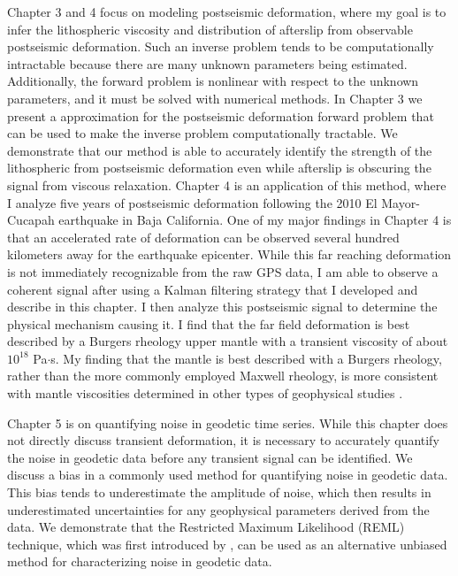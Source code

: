 Chapter 3 and 4 focus on modeling postseismic deformation, where my
goal is to infer the lithospheric viscosity and distribution of
afterslip from observable postseismic deformation. Such an inverse
problem tends to be computationally intractable because there are many
unknown parameters being estimated. Additionally, the forward problem
is nonlinear with respect to the unknown parameters, and it must be
solved with numerical methods. In Chapter 3 we present a approximation
for the postseismic deformation forward problem that can be used to
make the inverse problem computationally tractable. We demonstrate
that our method is able to accurately identify the strength of the
lithospheric from postseismic deformation even while afterslip is
obscuring the signal from viscous relaxation. Chapter 4 is an
application of this method, where I analyze five years of postseismic
deformation following the 2010 El Mayor-Cucapah earthquake in Baja
California. One of my major findings in Chapter 4 is that an
accelerated rate of deformation can be observed several hundred
kilometers away for the earthquake epicenter. While this far reaching
deformation is not immediately recognizable from the raw GPS data, I
am able to observe a coherent signal after using a Kalman filtering
strategy that I developed and describe in this chapter. I then analyze
this postseismic signal to determine the physical mechanism causing
it. I find that the far field deformation is best described by a
Burgers rheology upper mantle with a transient viscosity of about
$10^{18}$ Pa$\cdot$s. My finding that the mantle is best described
with a Burgers rheology, rather than the more commonly employed
Maxwell rheology, is more consistent with mantle viscosities
determined in other types of geophysical studies
\citep[e.g.,][]{Crittenden1967,Bills1987}.

Chapter 5 is on quantifying noise in geodetic time series.  While this
chapter does not directly discuss transient deformation, it is
necessary to accurately quantify the noise in geodetic data before any
transient signal can be identified. We discuss a bias in a commonly
used method for quantifying noise in geodetic data. This bias tends to
underestimate the amplitude of noise, which then results in
underestimated uncertainties for any geophysical parameters derived
from the data. We demonstrate that the Restricted Maximum Likelihood
(REML) technique, which was first introduced by \citet{Patterson1971},
can be used as an alternative unbiased method for characterizing noise
in geodetic data.

